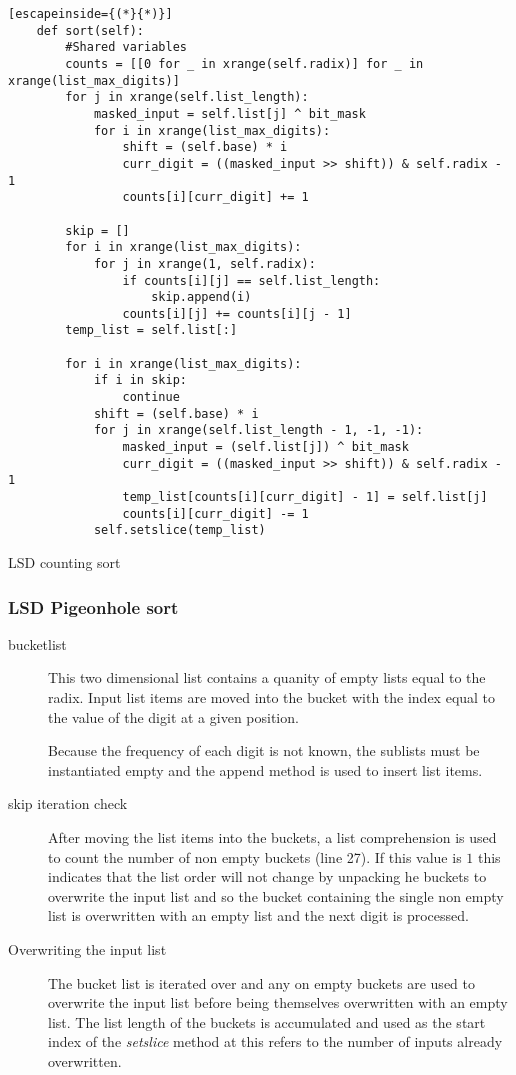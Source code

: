 \documentclass[12pt]{article}
\begin{document}
\begin{table}[H]
	\lstset{
		language=python,
    numbers=left,
    stepnumber=1,
    showstringspaces=false,
    tabsize=3,
    breaklines=true,
    breakatwhitespace=false,}
	\centering
	\begin{lstlisting}[escapeinside={(*}{*)}]
	def sort(self):
		#Shared variables		
		counts = [[0 for _ in xrange(self.radix)] for _ in xrange(list_max_digits)]
		for j in xrange(self.list_length):
			masked_input = self.list[j] ^ bit_mask
			for i in xrange(list_max_digits):
				shift = (self.base) * i
				curr_digit = ((masked_input >> shift)) & self.radix - 1
				counts[i][curr_digit] += 1

		skip = []
		for i in xrange(list_max_digits):
			for j in xrange(1, self.radix):
				if counts[i][j] == self.list_length:
					skip.append(i)
				counts[i][j] += counts[i][j - 1]
		temp_list = self.list[:]

		for i in xrange(list_max_digits):
			if i in skip:
				continue
			shift = (self.base) * i
			for j in xrange(self.list_length - 1, -1, -1):
				masked_input = (self.list[j]) ^ bit_mask
				curr_digit = ((masked_input >> shift)) & self.radix - 1
				temp_list[counts[i][curr_digit] - 1] = self.list[j]
				counts[i][curr_digit] -= 1
			self.setslice(temp_list)
	\end{lstlisting}
	\caption*{LSD counting sort}
\end{table}
\pagebreak
\subsubsection{LSD Pigeonhole sort}
\begin{description}
	\item[bucket\textunderscore list] This two dimensional list contains a quanity of empty lists equal to the radix. Input list items are moved into the bucket with the index equal to the value of the digit at a given position.\par Because the frequency of each digit is not known, the sublists must be instantiated empty and the append method is used to insert list items.
	\item[skip iteration check] After moving the list items into the buckets, a list comprehension is used to count the number of non empty buckets (line 27). If this value is $1$ this indicates that the list order will not change by unpacking he buckets to overwrite the input list and so the bucket containing the single non empty list is overwritten with an empty list and the next digit is processed.
	\item[Overwriting the input list] The bucket list is iterated over and any on empty buckets are used to overwrite the input list before being themselves overwritten with an empty list. The list length of the buckets is accumulated and used as the start index of the \textit{setslice} method at this refers to the number of inputs already overwritten.
\end{description}
\end{document}
